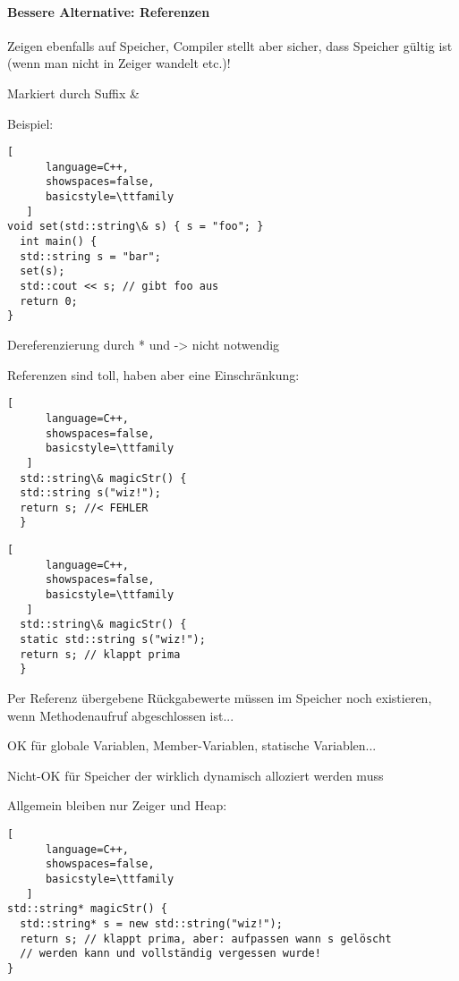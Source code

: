 \documentclass[10pt]{article}
\begin{document}
\paragraph{Bessere Alternative: Referenzen}
\begin{itemize*}
  \item Zeigen ebenfalls auf Speicher, Compiler stellt aber sicher, dass Speicher gültig ist (wenn man nicht in Zeiger wandelt etc.)!
  \item Markiert durch Suffix \&
  \item Beispiel:
  \begin{lstlisting}[
      language=C++,
      showspaces=false,
      basicstyle=\ttfamily
   ]
void set(std::string\& s) { s = "foo"; }
  int main() {
  std::string s = "bar";
  set(s);
  std::cout << s; // gibt foo aus
  return 0;
}
\end{lstlisting}
  
  \item Dereferenzierung durch * und -> nicht notwendig
  \item Referenzen sind toll, haben aber eine Einschränkung:
  \begin{lstlisting}[
      language=C++,
      showspaces=false,
      basicstyle=\ttfamily
   ]
  std::string\& magicStr() {
  std::string s("wiz!");
  return s; //< FEHLER
  }
\end{lstlisting}
  
  \begin{lstlisting}[
      language=C++,
      showspaces=false,
      basicstyle=\ttfamily
   ]
  std::string\& magicStr() {
  static std::string s("wiz!");
  return s; // klappt prima
  }
\end{lstlisting}
  
  \item Per Referenz übergebene Rückgabewerte müssen im Speicher noch existieren, wenn Methodenaufruf abgeschlossen ist...
  \begin{itemize*}
    \item OK für globale Variablen, Member-Variablen, statische Variablen...
    \item Nicht-OK für Speicher der wirklich dynamisch alloziert werden muss
  \end{itemize*}
  \item Allgemein bleiben nur Zeiger und Heap:
  \begin{lstlisting}[
      language=C++,
      showspaces=false,
      basicstyle=\ttfamily
   ]
std::string* magicStr() {
  std::string* s = new std::string("wiz!");
  return s; // klappt prima, aber: aufpassen wann s gelöscht
  // werden kann und vollständig vergessen wurde!
}
\end{lstlisting}
  

\end{itemize*}
\end{document}
